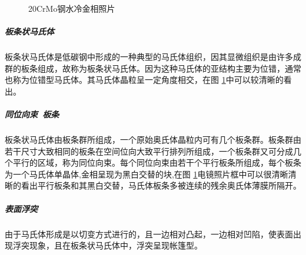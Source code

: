 \documentclass[12pt]{ctexart}
\begin{document}
\begin{figure}[h]
  \centering
  \caption{20CrMo钢水冷金相照片}
  \label{20water}
\end{figure}
\subparagraph{板条状马氏体}
板条状马氏体是低碳钢中形成的一种典型的马氏体组织，因其显微组织是由许多成群的板条组成，故称为板条状马氏体。因为这种马氏体的亚结构主要为位错，通常也称为位错型马氏体。其马氏体晶粒呈一定角度相交，在图 \ref{20water}中可以较清晰的看出。
\subparagraph{同位向束\  板条}
板条状马氏体由板条群所组成，一个原始奥氏体晶粒内可有几个板条群。板条群由若干尺寸大致相同的板条在空间位向大致平行排列所组成，一个板条群又可分成几个平行的区域，称为同位向束。每个同位向束由若干个平行板条所组成，每个板条为一个马氏体单晶体,金相呈现为黑白交替的块,在图 \ref{20water}电镜照片框中可以很清晰清晰的看出平行板条和其黑白交替，马氏体板条多被连续的残余奥氏体薄膜所隔开。
\subparagraph{表面浮突}
由于马氏体形成是以切变方式进行的，且一边相对凸起，一边相对凹陷，使表面出现浮突现象，且在板条状马氏体中，浮突呈现帐篷型。
\end{document}
